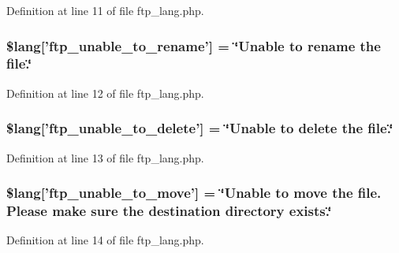 Definition at line 11 of file ftp\-\_\-lang.\-php.

\hypertarget{ftp__lang_8php_ae2715b036a8015f4da2841c15ab8db79}{
\subsubsection[{\$lang}]{\setlength{\rightskip}{0pt plus 5cm}\$lang\mbox{[}'ftp\-\_\-unable\-\_\-to\-\_\-rename'\mbox{]} = \char`\"{}Unable {\bf to} rename the file.\char`\"{}}}\label{ftp__lang_8php_ae2715b036a8015f4da2841c15ab8db79}


Definition at line 12 of file ftp\-\_\-lang.\-php.

\hypertarget{ftp__lang_8php_a922b1d7a3667e2cacb0873788e548dca}{
\subsubsection[{\$lang}]{\setlength{\rightskip}{0pt plus 5cm}\$lang\mbox{[}'ftp\-\_\-unable\-\_\-to\-\_\-delete'\mbox{]} = \char`\"{}Unable {\bf to} delete the file.\char`\"{}}}\label{ftp__lang_8php_a922b1d7a3667e2cacb0873788e548dca}


Definition at line 13 of file ftp\-\_\-lang.\-php.

\hypertarget{ftp__lang_8php_a72178091982e6697b12337601213fa76}{
\subsubsection[{\$lang}]{\setlength{\rightskip}{0pt plus 5cm}\$lang\mbox{[}'ftp\-\_\-unable\-\_\-to\-\_\-move'\mbox{]} = \char`\"{}Unable {\bf to} move the file. Please make sure the destination directory exists.\char`\"{}}}\label{ftp__lang_8php_a72178091982e6697b12337601213fa76}


Definition at line 14 of file ftp\-\_\-lang.\-php.

